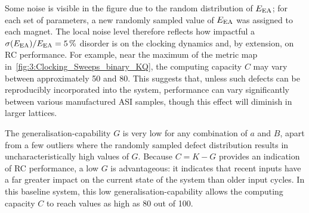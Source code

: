 Some noise is visible in the figure due to the random distribution of $E_\mathrm{EA}$; for each set of parameters, a new randomly sampled value of $E_\mathrm{EA}$ was assigned to each magnet.
The local noise level therefore reflects how impactful a $\sigma(E_\mathrm{EA})/E_\mathrm{EA} = \SI{5}{\percent}$ disorder is on the clocking dynamics and, by extension, on RC performance.
For example, near the maximum of the metric map in~\cref{fig:3:Clocking_Sweeps_binary_KQ}, the computing capacity $C$ may vary between approximately 50 and 80.
This suggests that, unless such defects can be reproducibly incorporated into the system, performance can vary significantly between various manufactured ASI samples, though this effect will diminish in larger lattices. \par
The generalisation-capability $G$ is very low for any combination of $a$ and $B$, apart from a few outliers where the randomly sampled defect distribution results in uncharacteristically high values of $G$.
Because $C=K-G$ provides an indication of RC performance, a low $G$ is advantageous: it indicates that recent inputs have a far greater impact on the current state of the system than older input cycles.
In this baseline system, this low generalisation-capability allows the computing capacity $C$ to reach values as high as 80 out of 100.

